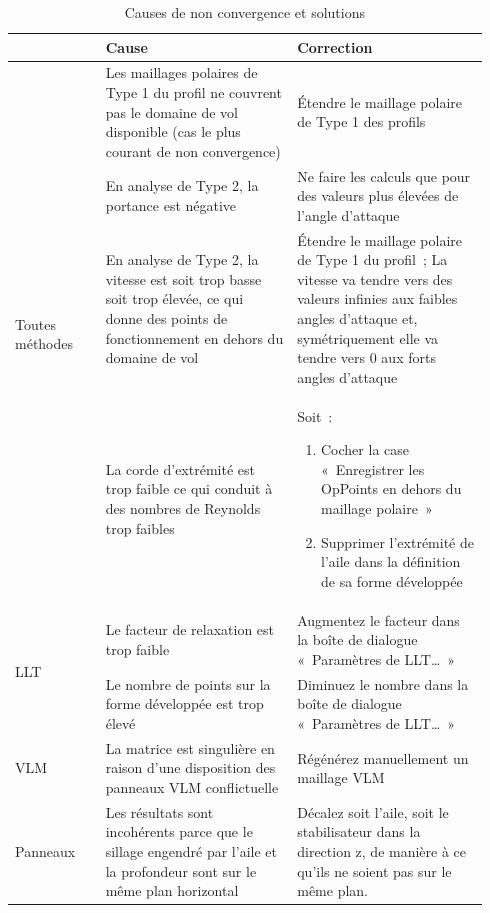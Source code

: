 \documentclass[a4paper,twoside,12pt,dvips]{article}
\begin{document}
\begin{table}[htbp]\scriptsize
  \centering
  \begin{tabular}{|m{0.18\linewidth}|m{0.38\linewidth}|m{0.38\linewidth}|}
    \hline
    &
    Cause &
    Correction \\
    \hline
    \multirow{4}{0.18\linewidth}{Toutes méthodes} &
    Les maillages polaires de Type 1 du profil ne couvrent pas le domaine de
    vol disponible\newline
    (cas le plus courant de non convergence) &
    Étendre le maillage polaire de Type 1 des profils\\
    \cline{2-3}
    &
    En analyse de Type 2, la portance est négative & 
    Ne faire les calculs que pour des valeurs plus élevées de l’angle
    d’attaque\\
    \cline{2-3}
    &
    En analyse de Type 2, la vitesse est soit trop basse soit trop élevée,
    ce qui donne des points de fonctionnement en dehors du domaine de vol &
    Étendre le maillage polaire de Type 1 du profil~; La vitesse va tendre
    vers des valeurs infinies aux faibles angles d’attaque et, symétriquement
    elle va tendre vers 0 aux forts angles d’attaque\\
    \cline{2-3}
    &
    La corde d’extrémité est trop faible ce qui conduit à des nombres de 
    Reynolds trop faibles &
    Soit~:
    \begin{enumerate}
     \item Cocher la case «~Enregistrer les OpPoints en dehors du maillage
     polaire~»
     \item Supprimer l’extrémité de l’aile dans la définition de sa forme 
     développée
    \end{enumerate} \\
    \hline
    \multirow{2}{0.18\linewidth}{LLT} & 
    Le facteur de relaxation est trop faible &
    Augmentez le facteur dans la boîte de dialogue «~Paramètres de LLT\dots~»\\
    \cline{2-3}
    &
    Le nombre de points sur la forme développée est trop élevé &
    Diminuez le nombre dans la boîte de dialogue «~Paramètres de LLT\dots~»\\
    \hline
    VLM &
    La matrice est singulière en raison d’une disposition des panneaux VLM
    conflictuelle &
    Régénérez manuellement un maillage VLM \\
    \hline
    Panneaux &
    Les résultats sont incohérents parce que le sillage engendré par l’aile
    et la profondeur sont sur le même plan horizontal & 
    Décalez soit l’aile, soit le stabilisateur dans la direction z, de
    manière à ce qu’ils ne soient pas sur le même plan.\\
    \hline
  \end{tabular}
  \caption{Causes de non convergence et solutions}
  \label{table non convergences causes et solutions}
\end{table}
\end{document}
